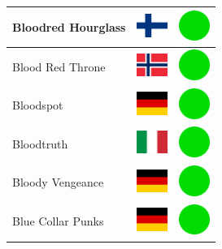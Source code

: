 \documentclass[12pt, a4paper, twoside]{report}
\begin{document}
\begin{center}
\begin{longtable}{|p{5cm}|p{2cm}|p{2cm}|}
 Bloodred Hourglass                                         & \includegraphics[width=1cm]{../4x3/fi} &   \includegraphics[width=1cm]{../likes/y} \\ \hline
 Blood Red Throne                                           & \includegraphics[width=1cm]{../4x3/no} &   \includegraphics[width=1cm]{../likes/y} \\ \hline
 Bloodspot                                                  & \includegraphics[width=1cm]{../4x3/de} &   \includegraphics[width=1cm]{../likes/y} \\ \hline
 Bloodtruth                                                 & \includegraphics[width=1cm]{../4x3/it} &   \includegraphics[width=1cm]{../likes/y} \\ \hline
 Bloody Vengeance                                           & \includegraphics[width=1cm]{../4x3/de} &   \includegraphics[width=1cm]{../likes/y} \\ \hline
 Blue Collar Punks                                          & \includegraphics[width=1cm]{../4x3/de} &   \includegraphics[width=1cm]{../likes/y} \\ \hline

\end{longtable}
\end{center}
\end{document}
